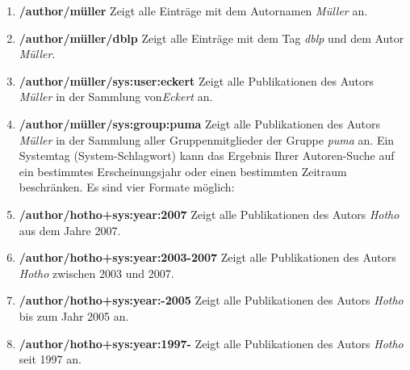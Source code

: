 \begin{enumerate}
    \item \textbf{/author/müller} \newline
    Zeigt alle Einträge mit dem Autornamen \textit{Müller} an.
    \item \textbf{/author/müller/dblp} \newline
    Zeigt alle Einträge mit dem Tag \textit{dblp} und dem Autor \textit{Müller}.
    \item \textbf{/author/müller/sys:user:eckert}\newline
    Zeigt alle Publikationen des Autors \textit{Müller} in der Sammlung von\textit{Eckert} an.
    \item \textbf{/author/müller/sys:group:puma} \newline
    Zeigt alle Publikationen des Autors \textit{Müller} in der Sammlung aller Gruppenmitglieder der Gruppe \textit{puma} an. 
\newline
\newline
Ein Systemtag (System-Schlagwort) kann das Ergebnis Ihrer Autoren-Suche auf ein bestimmtes Erscheinungsjahr oder einen bestimmten Zeitraum beschränken. Es sind vier Formate möglich:%
    \item \textbf{/author/hotho+sys:year:2007} \newline
    Zeigt alle Publikationen des Autors \textit{Hotho} aus dem Jahre 2007.
    \item \textbf{/author/hotho+sys:year:2003-2007} \newline
    Zeigt alle Publikationen des Autors \textit{Hotho} zwischen 2003 und 2007.
    \item \textbf{/author/hotho+sys:year:-2005} \newline
    Zeigt alle Publikationen des Autors \textit{Hotho} bis zum Jahr 2005 an.
    \item \textbf{/author/hotho+sys:year:1997-} \newline
    Zeigt alle Publikationen des Autors \textit{Hotho} seit 1997 an.
\end{enumerate}

